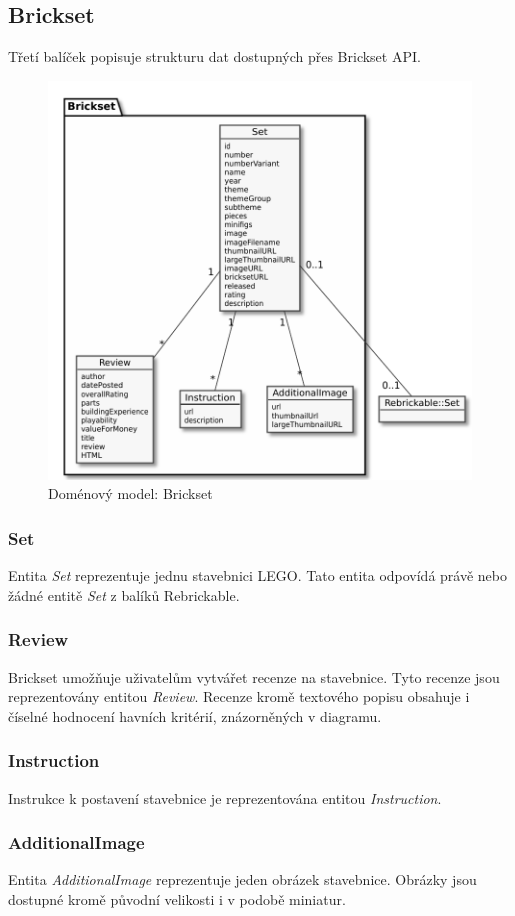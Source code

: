 \subsection{Brickset}
Třetí balíček popisuje strukturu dat dostupných přes Brickset \gls{API}.   

\begin{figure}[htbp]
    \centering
    \includegraphics[width=\textwidth,height=\textheight,keepaspectratio]{pdfs/domain_brickset}
    \caption{Doménový model: Brickset \label{diagram-domenovy-brickset}}
\end{figure}

\subsubsection*{Set}
Entita \textit{Set} reprezentuje jednu stavebnici LEGO. Tato entita odpovídá právě nebo žádné entitě \textit{Set} z balíků Rebrickable.  

\subsubsection*{Review}
Brickset umožňuje uživatelům vytvářet recenze na stavebnice. Tyto recenze jsou reprezentovány entitou \textit{Review}. Recenze kromě textového popisu obsahuje i číselné hodnocení havních kritérií, znázorněných v diagramu.

\subsubsection*{Instruction} 
Instrukce k postavení stavebnice je reprezentována entitou \textit{Instruction}.

\subsubsection*{AdditionalImage} 
Entita \textit{AdditionalImage} reprezentuje jeden obrázek stavebnice. Obrázky jsou dostupné kromě původní velikosti i v podobě miniatur.


